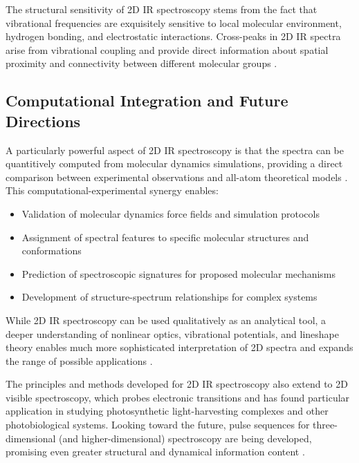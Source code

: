 \noindent The structural sensitivity of 2D IR spectroscopy stems from the fact that vibrational frequencies are exquisitely sensitive to local molecular environment, hydrogen bonding, and electrostatic interactions. Cross-peaks in 2D IR spectra arise from vibrational coupling and provide direct information about spatial proximity and connectivity between different molecular groups \cite{HammZanni2011ConceptsMethods2D}.

\subsection{Computational Integration and Future Directions}
\label{subsec:computational_integration}

\noindent A particularly powerful aspect of 2D IR spectroscopy is that the spectra can be quantitively computed from molecular dynamics simulations, providing a direct comparison between experimental observations and all-atom theoretical models \cite{HammZanni2011ConceptsMethods2D}. This computational-experimental synergy enables:

\begin{itemize}
    \item Validation of molecular dynamics force fields and simulation protocols
    \item Assignment of spectral features to specific molecular structures and conformations
    \item Prediction of spectroscopic signatures for proposed molecular mechanisms
    \item Development of structure-spectrum relationships for complex systems
\end{itemize}

\noindent While 2D IR spectroscopy can be used qualitatively as an analytical tool, a deeper understanding of nonlinear optics, vibrational potentials, and lineshape theory enables much more sophisticated interpretation of 2D spectra and expands the range of possible applications \cite{HammZanni2011ConceptsMethods2D}.

\noindent The principles and methods developed for 2D IR spectroscopy also extend to 2D visible spectroscopy, which probes electronic transitions and has found particular application in studying photosynthetic light-harvesting complexes and other photobiological systems. Looking toward the future, pulse sequences for three-dimensional (and higher-dimensional) spectroscopy are being developed, promising even greater structural and dynamical information content \cite{HammZanni2011ConceptsMethods2D}.

